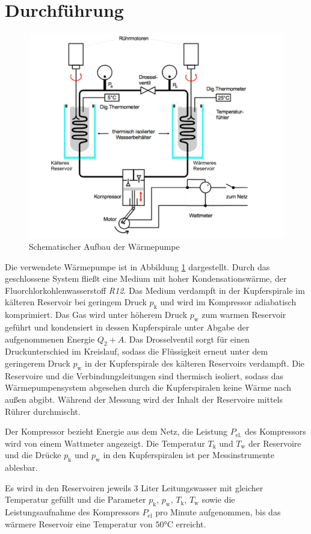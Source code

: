 \section{Durchführung}
\label{sec:Durchfuehrung}
\begin{figure}
	\includegraphics[width=\textwidth]{Bilder/Abbildung.pdf}
	\caption{Schematischer Aufbau der Wärmepumpe \cite{V206}}
	\label{fig:pumpe}
\end{figure}
Die verwendete Wärmepumpe ist in Abbildung \ref{fig:pumpe} dargestellt.
Durch das geschlossene System fließt eine Medium mit hoher Kondensationswärme, der Fluorchlorkohlenwasserstoff \textit{R12}.
Das Medium verdampft in der Kupferspirale im kälteren Reservoir bei geringem Druck $p_\text{k}$ und wird im Kompressor adiabatisch komprimiert. 
Das Gas wird unter höherem Druck $p_\text{w}$ zum warmen Reservoir geführt und kondensiert in dessen Kupferspirale unter Abgabe der aufgenommenen Energie $Q_2+A$.
Das Drosselventil sorgt für einen Druckunterschied im Kreislauf, sodass die Flüssigkeit erneut unter dem geringerem Druck $p_\text{w}$ in der Kupferspirale des kälteren Reservoirs verdampft. 
Die Reservoire und die Verbindungsleitungen sind thermisch isoliert, sodass das Wärmepumpensystem abgesehen durch die Kupferspiralen keine Wärme nach außen abgibt.
Während der Messung wird der Inhalt der Reservoire mittels Rührer durchmischt.

Der Kompressor bezieht Energie aus dem Netz, die Leistung $P_\text{el.}$ des Kompressors wird von einem Wattmeter angezeigt. 
Die Temperatur $T_\text{k}$ und $T_\text{w}$ der Reservoire und die Drücke $p_\text{k}$ und $p_\text{w}$ in den Kupferspiralen ist per Messinstrumente ablesbar.

Es wird in den Reservoiren jeweils 3 Liter Leitungswasser mit gleicher Temperatur gefüllt und die Parameter $p_\text{k}$, $p_\text{w}$, $T_\text{k}$, $T_\text{w}$ sowie die Leistungsaufnahme des Kompressors $P_\text{el}$ pro Minute aufgenommen, bis das wärmere Reservoir eine Temperatur von $50\si{\degreeCelsius}$ erreicht.